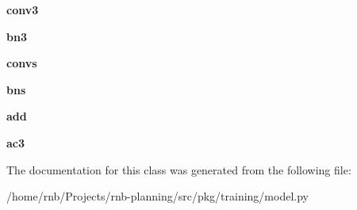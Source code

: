 \begin{DoxyCompactItemize}
{\bfseries conv3}
\item 
\mbox{\label{classrnb-planning_1_1src_1_1pkg_1_1training_1_1model_1_1_conv_block_a720d276532f552d13c669788ee4b180a}} 
{\bfseries bn3}
\item 
\mbox{\label{classrnb-planning_1_1src_1_1pkg_1_1training_1_1model_1_1_conv_block_a02cd17f80dfeae71d9b839c259051fa2}} 
{\bfseries convs}
\item 
\mbox{\label{classrnb-planning_1_1src_1_1pkg_1_1training_1_1model_1_1_conv_block_a266743a5b91dcd83e560438d2493ed41}} 
{\bfseries bns}
\item 
\mbox{\label{classrnb-planning_1_1src_1_1pkg_1_1training_1_1model_1_1_conv_block_a9685dd38ab2918d5715b4121801f105b}} 
{\bfseries add}
\item 
\mbox{\label{classrnb-planning_1_1src_1_1pkg_1_1training_1_1model_1_1_conv_block_a67733414a3fa1a5bc1ac8f6523c079a4}} 
{\bfseries ac3}
\end{DoxyCompactItemize}


The documentation for this class was generated from the following file\+:\begin{DoxyCompactItemize}
\item 
/home/rnb/\+Projects/rnb-\/planning/src/pkg/training/model.\+py\end{DoxyCompactItemize}
